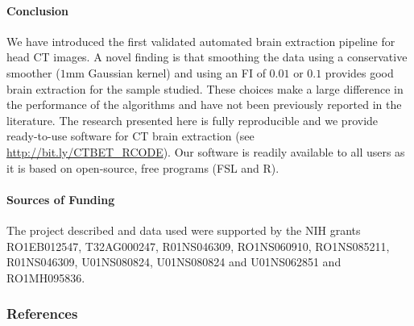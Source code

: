 \documentclass[10pt]{article}\usepackage[]{graphicx}\usepackage[]{color}
\begin{document}
\vspace{-0.5cm}
\paragraph*{Conclusion}
We have introduced the first validated automated brain extraction pipeline for head CT images.  A novel finding is that smoothing the data using a conservative smoother ($1$mm Gaussian kernel) and using an FI of $0.01$ or $0.1$ provides good brain extraction for the sample studied.  These choices make a large difference in the performance of the algorithms and have not been previously reported in the literature.  The research presented here is fully reproducible and we provide ready-to-use software for CT brain extraction (see \url{http://bit.ly/CTBET_RCODE}). Our software is readily available to all users as it is based on open-source, free programs (FSL and R).


\vspace{-0.4cm}
\paragraph*{Sources of Funding}
The project described and data used were supported by the NIH grants RO1EB012547, T32AG000247, R01NS046309, RO1NS060910, RO1NS085211, R01NS046309, U01NS080824, U01NS080824 and U01NS062851 and RO1MH095836.

\vspace{-0.25cm}
\subsubsection*{References}
\renewcommand\refname{\vskip -1cm}



\end{document}
